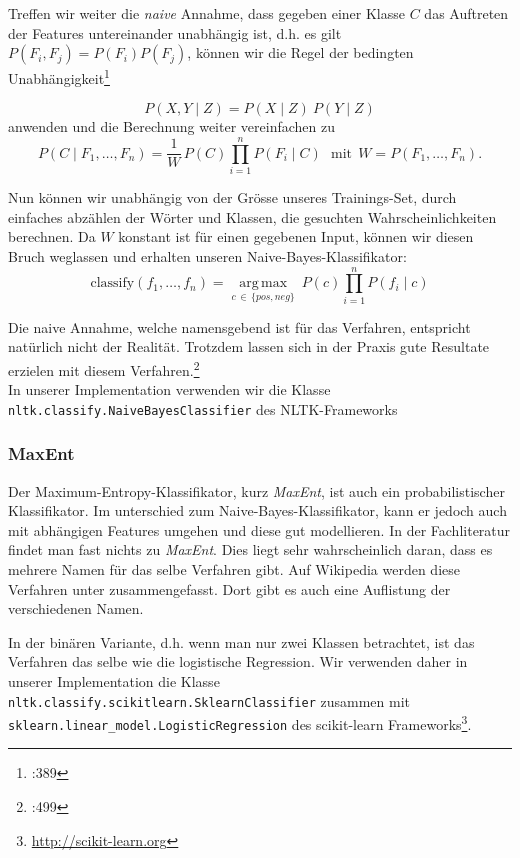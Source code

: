 \documentclass[12pt, oneside]{report}   	%
\begin{document}
Treffen wir weiter die \emph{naive} Annahme, dass gegeben einer Klasse $C$ das Auftreten der Features untereinander unabhängig ist,
d.h. es gilt $P(F_i,F_j) = P(F_i)P(F_j)$, können wir die Regel der bedingten Unabhängigkeit\footnote{\cite{alp}:389 }

$$ P(X,Y \mid Z) = P(X \mid Z) \ P(Y \mid Z) $$
anwenden und die Berechnung weiter vereinfachen zu
$$
P(C \mid F_1,\dots,F_n) = \frac{1}{W} \, P(C) \prod_{i=1}^n P(F_i\mid C)\ \ \ \mathrm{mit} \ \ W = P(F_1,\dots,F_n).
$$

Nun können wir unabhängig von der Grösse unseres Trainings-Set, durch einfaches abzählen der Wörter und Klassen, die gesuchten Wahrscheinlichkeiten berechnen.
Da $W$ konstant ist für einen gegebenen Input, können wir diesen Bruch weglassen und erhalten unseren Naive-Bayes-Klassifikator:
$$ \mathrm{classify}(f_1,\dots,f_n) = \underset{c \, \in \, \{pos,neg\} }{\operatorname{arg\,max}} \ P(c) \displaystyle\prod_{i=1}^n P(f_i\mid c) $$

Die naive Annahme, welche namensgebend ist für das Verfahren, entspricht natürlich nicht der Realität. 
Trotzdem lassen sich in der Praxis gute Resultate erzielen mit diesem Verfahren.\footnote{\cite{ai}:499}
\\

In unserer Implementation verwenden wir die Klasse\\
 \verb|nltk.classify.NaiveBayesClassifier| des NLTK-Frameworks
 


\subsubsection{MaxEnt}

Der Maximum-Entropy-Klassifikator, kurz \emph{MaxEnt}, ist auch ein probabilistischer Klassifikator. Im unterschied zum Naive-Bayes-Klassifikator, kann er jedoch auch mit abhängigen Features umgehen und diese gut modellieren.
In der Fachliteratur findet man fast nichts zu \emph{MaxEnt}. Dies liegt sehr wahrscheinlich daran, dass es mehrere Namen für das selbe Verfahren gibt. 
Auf Wikipedia\cite{mlr} werden diese Verfahren unter  zusammengefasst. Dort gibt es auch eine Auflistung der verschiedenen Namen.

In der binären Variante, d.h. wenn man nur zwei Klassen betrachtet, ist das Verfahren das selbe wie die logistische Regression. Wir verwenden daher in unserer Implementation die Klasse
\verb|nltk.classify.scikitlearn.SklearnClassifier| zusammen mit
\verb|sklearn.linear_model.LogisticRegression| des scikit-learn Frameworks\footnote{\url{http://scikit-learn.org}}.
\end{document}
